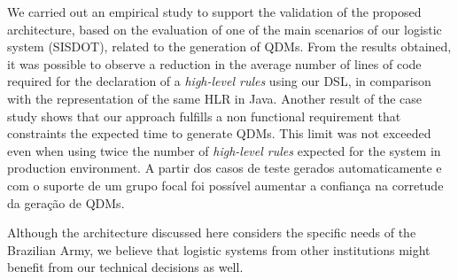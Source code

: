 \documentclass[twocolumn]{bmcart}%
\newcommand{\callers}{\emph{high-level rules}\xspace}
\newcommand{\shc}{HLR\xspace}
\begin{document}
We carried out an empirical study to support the validation of the proposed architecture, based on the evaluation of one of the main scenarios of our logistic system (SISDOT), related to the generation of QDMs. From the results obtained, it was possible to observe a reduction in the average number of lines of code required for the declaration of a \callers using our DSL, in comparison with the representation of the same \shc in Java. Another result of the case study shows that our approach fulfills a non functional requirement that constraints the expected time to generate QDMs. This limit was not exceeded even when using twice the number of \callers expected for the system in production environment. A partir dos casos de teste gerados automaticamente e com o suporte de um grupo focal foi possível aumentar a confiança na corretude da geração de QDMs.

Although the architecture discussed here considers the specific needs of the Brazilian Army, we believe that logistic systems from other institutions might benefit from our technical decisions as well.





\end{document}
